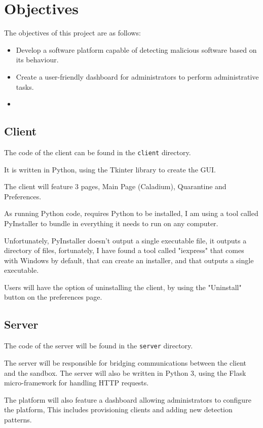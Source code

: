 \section{Objectives}
The objectives of this project are as follows:
\begin{itemize}
    \item Develop a software platform capable of detecting malicious software based on its behaviour.
    \item Create a user-friendly dashboard for administrators to perform administrative tasks.
    \item 
\end{itemize}

\subsection{Client}
The code of the client can be found in the \texttt{client} directory.

It is written in Python, using the Tkinter library to create the GUI.

The client will feature 3 pages, Main Page (Caladium), Quarantine and Preferences.

As running Python code, requires Python to be installed,
I am using a tool called PyInstaller to bundle in everything it needs to run on any computer.

Unfortunately, PyInstaller doesn't output a single executable file,
it outputs a directory of files, fortunately, I have found a tool called "iexpress" that comes with Windows by default, that can create an installer,
and that outputs a single executable.

Users will have the option of uninstalling the client, by using the "Uninstall" button on the preferences page.

\subsection{Server}
The code of the server will be found in the \texttt{server} directory.

The server will be responsible for bridging communications between the client and the sandbox.
The server will also be written in Python 3, using the Flask micro-framework for handling HTTP requests.

The platform will also feature a dashboard allowing administrators to configure the platform,
This includes provisioning clients and adding new detection patterns.

